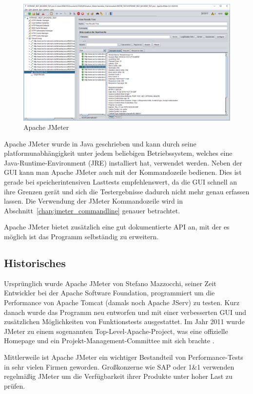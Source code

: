 \documentclass[a4paper,12pt]{article}
\begin{document}
\begin{figure}[htb]%
 \centering
    \includegraphics[width=1\textwidth]{bilder/jmeter_1.png}
  \caption{Apache JMeter}
  \label{fig:jmeter_gui}
\end{figure}
Apache JMeter wurde in Java geschrieben und kann durch seine platformunabhängigkeit unter jedem beliebigen Betriebssystem, welches eine Java-Runtime-Environment (JRE) installiert hat, verwendet werden. Neben der GUI kann man Apache JMeter auch mit der Kommandozeile bedienen. Dies ist gerade bei speicherintensiven Lasttests empfehlenswert, da die GUI schnell an ihre Grenzen gerät und sich die Testergebnisse dadurch nicht mehr genau erfassen lassen. Die Verwendung der JMeter Kommandozeile wird in Abschnitt~\ref{chap:jmeter_commandline} genauer betrachtet.

Apache JMeter bietet zusätzlich eine gut dokumentierte API an, mit der es möglich ist das Programm selbständig zu erweitern.

\subsection{Historisches}
Ursprünglich wurde Apache JMeter von Stefano Mazzocchi, seiner Zeit Entwickler bei der Apache Software Foundation, programmiert um die Performance von Apache Tomcat (damals noch Apache JServ) zu testen. Kurz danach wurde das Programm neu entworfen und mit einer verbesserten GUI und zusätzlichen Möglichkeiten von Funktionstests ausgestattet. Im Jahr 2011 wurde JMeter zu einem sogenannten Top-Level-Apache-Project, was eine offizielle Homepage und ein Projekt-Management-Committee mit sich brachte \cite{online:officialJMeter}.

Mittlerweile ist Apache JMeter ein wichtiger Bestandteil von Performance-Tests in sehr vielen Firmen geworden. Großkonzerne wie SAP oder 1\&1 verwenden regelmäßig JMeter um die Verfügbarkeit ihrer Produkte unter hoher Last zu prüfen. 
\end{document}
